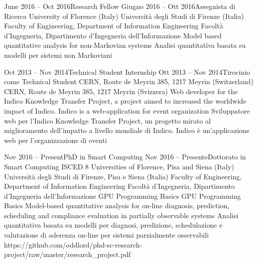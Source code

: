 {    \job
    {June 2016 -- Oct 2016}{Research Fellow}
    {Giugno 2016 -- Ott 2016}{Assegnista di Ricerca}
      \jobLocation
        {University of Florence (Italy)}
        {Università degli Studi di Firenze (Italia)}
      \jobDepartment
        {Faculty of Engineering, Department of Information Engineering}
        {Facoltà d'Ingegneria, Dipartimento d'Ingegneria dell'Informazione}
      \jobDescription
        {Model based quantitative analysis for non-Markovian systems}
        {Analisi quantitativa basata su modelli per sistemi non Markoviani}
    
    \job
    {Oct 2013 -- Nov 2014}{Technical Student Internship}
    {Ott 2013 -- Nov 2014}{Tirocinio come Technical Student}
      \jobLocation
        {CERN, Route de Meyrin 385, 1217 Meyrin (Switzerland)}
        {CERN, Route de Meyrin 385, 1217 Meyrin (Svizzera)}
      \jobDescription
        {Web developer for the Indico Knowledge Transfer Project, a project aimed to increased the worldwide impact of Indico. Indico is a web-application for event organization}
        {Sviluppatore web per l'Indico Knowledge Transfer Project, un progetto mirato al miglioramento dell'impatto a livello mondiale di Indico. Indico è un'applicazione web per l'organizzazione di eventi}


  \educationAndTraining
  
    \school
    {Nov 2016 -- Present}{PhD in Smart Computing}
    {Nov 2016 -- Presente}{Dottorato in Smart Computing}
    {ISCED 8}
      \schoolLocation
        {Universities of Florence, Pisa and Siena (Italy)}
        {Università degli Studi di Firenze, Pisa e Siena (Italia)}
      \schoolFaculty
        {Faculty of Engineering, Department of Information Engineering}
        {Facoltà d'Ingegneria, Dipartimento d'Ingegneria dell'Informazione}
      \courses
        {GPU Programming Basics}
        {GPU Programming Basics}
      \thesisURL
        {Model-based quantitative analysis for on-line diagnosis, prediction, scheduling and compliance evaluation in partially observable systems}
        {Analisi quantitativa basata su modelli per diagnosi, predizione, schedulazione e valutazione di aderenza on-line per sistemi parzialmente osservabili}
        {https://github.com/oddlord/phd-sc-research-project/raw/master/research_project.pdf}

}
